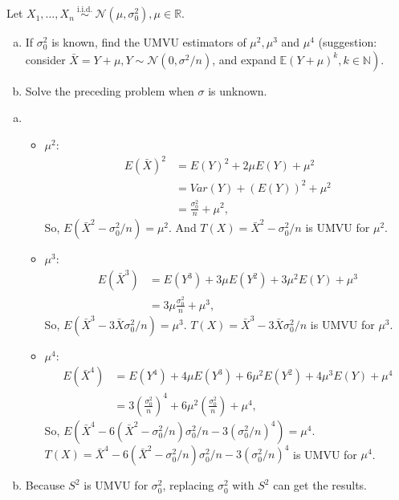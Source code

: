 \begin{exercise}
    Let \(X_{1}, \ldots, X_{n} \stackrel{\text { i.i.d. }}{\sim} \mathcal{N}\left(\mu, \sigma_{0}^{2}\right), \mu \in \mathbb{R}\). 
    \begin{enumerate}[(a)]
        \item If \(\sigma_{0}^{2}\) is known, find the UMVU estimators of \(\mu^{2}, \mu^{3}\) and \(\mu^{4}\) (suggestion: consider \(\bar{X}=Y+\mu, Y \sim \mathcal{N}\left(0, \sigma^{2} / n\right)\), and expand \(\left.\mathbb{E}(Y+\mu)^{k}, k \in \mathbb{N}\right)\). 
        \item Solve the preceding problem when \(\sigma\) is unknown. 
    \end{enumerate}
\end{exercise}

\begin{solution}
    \begin{enumerate}[(a)]
        \item \begin{itemize}
            \item $\mu^2$: 
            \[
                \begin{aligned}
                    E(\bar{X})^2&=E(Y)^2+2\mu E(Y)+\mu^2\\
                    &=Var(Y)+(E(Y))^2+\mu^2\\
                    &=\frac{\sigma_0^2}{n}+\mu^2, 
                \end{aligned}
            \]
            So, $E(\bar{X}^2-\sigma_0^2/n)=\mu^2$. And $T(X)=\bar{X}^2-\sigma_0^2/n$ is UMVU for $\mu^2$. 
            \item $\mu^3$: 
            \[
                \begin{aligned}
                    E(\bar{X}^3)&=E(Y^3)+3\mu E(Y^2)+3\mu^2E(Y)+\mu^3\\
                    &=3\mu\frac{\sigma^2_0}{n}+\mu^3, 
                \end{aligned}
            \]
            So, $E(\bar{X}^3-3\bar{X}\sigma_0^2/n)=\mu^3$. $T(X)=\bar{X}^3-3\bar{X}\sigma_0^2/n$ is UMVU for $\mu^3$. 
            \item $\mu^4$: 
            \[
                \begin{aligned}
                    E(\bar{X}^4)&=E(Y^4)+4\mu E(Y^3)+6\mu^2E(Y^2)+4\mu^3E(Y)+\mu^4\\
                    &=3\left(\frac{\sigma_0^2}{n}\right)^4+6\mu^2\left(\frac{\sigma_0^2}{n}\right)+\mu^4, 
                \end{aligned}
            \]
            So, $E(\bar{X}^4-6(\bar{X}^2-\sigma_0^2/n)\sigma_0^2/n-3(\sigma_0^2/n)^4)=\mu^4$. $T(X)=\bar{X}^4-6(\bar{X}^2-\sigma_0^2/n)\sigma_0^2/n-3(\sigma_0^2/n)^4$ is UMVU for $\mu^4$. 
        \end{itemize}
        \item Because $S^2$ is UMVU for $\sigma_0^2$, replacing $\sigma_0^2$ with $S^2$ can get the results. 
    \end{enumerate}
\end{solution}

